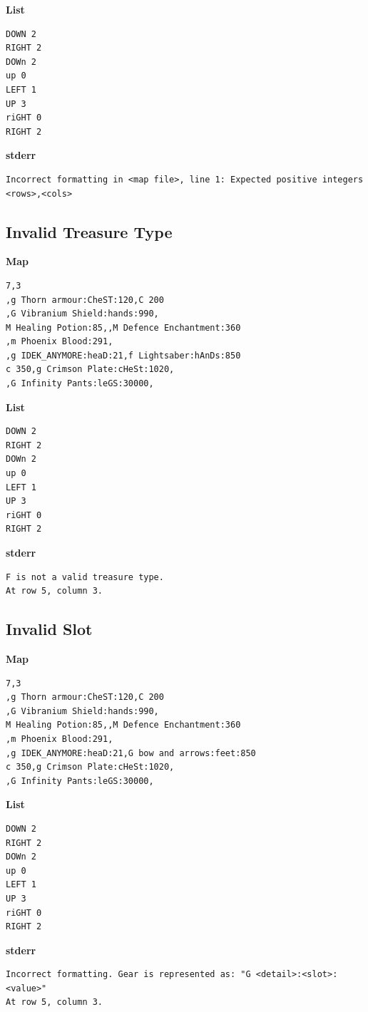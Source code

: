 \documentclass{article}
\begin{document}
\textbf{List}
\begin{lstlisting}
DOWN 2
RIGHT 2
DOWn 2
up 0
LEFT 1
UP 3
riGHT 0
RIGHT 2
\end{lstlisting}
\pagebreak

\textbf{stderr}
\begin{lstlisting}
Incorrect formatting in <map file>, line 1: Expected positive integers <rows>,<cols>
\end{lstlisting}

\subsection{Invalid Treasure Type}

\quad \textbf{Map}
\begin{lstlisting}
7,3
,g Thorn armour:CheST:120,C 200
,G Vibranium Shield:hands:990,
M Healing Potion:85,,M Defence Enchantment:360
,m Phoenix Blood:291,
,g IDEK_ANYMORE:heaD:21,f Lightsaber:hAnDs:850
c 350,g Crimson Plate:cHeSt:1020,
,G Infinity Pants:leGS:30000,
\end{lstlisting}

\textbf{List}
\begin{lstlisting}
DOWN 2
RIGHT 2
DOWn 2
up 0
LEFT 1
UP 3
riGHT 0
RIGHT 2
\end{lstlisting}
\pagebreak

\textbf{stderr}
\begin{lstlisting}
F is not a valid treasure type.
At row 5, column 3.
\end{lstlisting}

\subsection{Invalid Slot}

\quad \textbf{Map}
\begin{lstlisting}
7,3
,g Thorn armour:CheST:120,C 200
,G Vibranium Shield:hands:990,
M Healing Potion:85,,M Defence Enchantment:360
,m Phoenix Blood:291,
,g IDEK_ANYMORE:heaD:21,G bow and arrows:feet:850
c 350,g Crimson Plate:cHeSt:1020,
,G Infinity Pants:leGS:30000,
\end{lstlisting}

\textbf{List}
\begin{lstlisting}
DOWN 2
RIGHT 2
DOWn 2
up 0
LEFT 1
UP 3
riGHT 0
RIGHT 2
\end{lstlisting}
\pagebreak

\textbf{stderr}
\begin{lstlisting}
Incorrect formatting. Gear is represented as: "G <detail>:<slot>:<value>"
At row 5, column 3.
\end{lstlisting}
\end{document}

